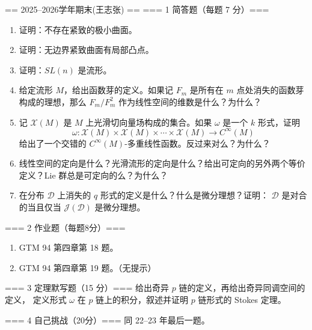== 2025--2026学年期末(王志张) ==
=== 1 简答题（每题 7 分）===
\begin{enumerate}
\item 证明：不存在紧致的极小曲面。
\item 证明：无边界紧致曲面有局部凸点。
\item 证明：$SL(n)$ 是流形。
\item 给定流形 $M$，给出函数芽的定义。如果记 $F_m$ 是所有在 $m$ 点处消失的函数芽构成的理想，那么 $F_m / F_m^2$ 作为线性空间的维数是什么？为什么？
\item 记 $\mathcal{X}(M)$ 是 $M$ 上光滑切向量场构成的集合。如果 $\omega$ 是一个 $k$ 形式，证明
\[\omega: \mathcal{X}(M) \times \mathcal{X}(M) \times \cdots \times \mathcal{X}(M) \rightarrow C^{\infty}(M)\]
给出了一个交错的 $C^\infty(M)$-多重线性函数。反过来对么？为什么？
\item 线性空间的定向是什么？光滑流形的定向是什么？给出可定向的另外两个等价定义？Lie 群总是可定向的么？为什么？
\item 在分布 $\mathscr{D}$ 上消失的 $q$ 形式的定义是什么？什么是微分理想？证明： $\mathscr{D}$ 是对合的当且仅当 $\mathscr{J}(\mathscr{D})$ 是微分理想。
\end{enumerate}

=== 2 作业题（每题8分）===
\begin{enumerate}
\item GTM 94 第四章第 18 题。
\item GTM 94 第四章第 19 题。（无提示）
\end{enumerate}

=== 3 定理默写题（15 分）===
给出奇异 $p$ 链的定义，再给出奇异同调空间的定义，
定义形式 $\omega$ 在 $p$ 链上的积分，叙述并证明 $p$ 链形式的 Stokes 定理。

=== 4 自己挑战（20分）===
同 22--23 年最后一题。

